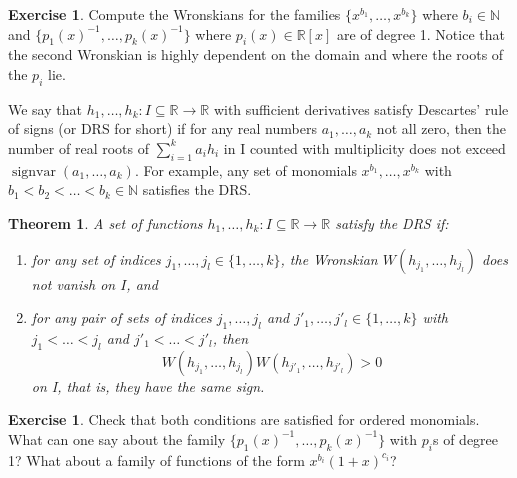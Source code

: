 \documentclass[11pt, a4paper]{article}
\newcommand{\NN}{\mathbb{N}}
\newcommand{\RR}{\mathbb{R}}
\DeclareMathOperator{\sv}{signvar}
\theoremstyle{plain}
\newtheorem{thm}[prop]{Theorem}
\theoremstyle{definition}
\newtheorem{ex}[prop]{Exercise}
\begin{document}
\begin{ex} Compute the Wronskians for the families $\{x^{b_1},\dots,x^{b_k}\}$ where $b_i\in \NN$ and $\{p_1(x)^{-1},\dots,p_k(x)^{-1}\}$ where $p_i(x)\in \RR[x]$ are of degree 1. Notice that the second Wronskian is highly dependent on the domain and where the roots of the $p_i$ lie.
\end{ex}

We say that $h_1,\dots,h_k:I\subseteq\RR\to\RR$ with sufficient derivatives satisfy Descartes' rule of signs (or DRS for short) if for any real numbers $a_1,\dots, a_k$ not all zero, then the number of real roots of $\sum_{i=1}^k a_ih_i$ in I counted with multiplicity does not exceed $\sv(a_1,\dots,a_k)$. For example, any set of monomials $x^{b_1},\dots, x^{b_k}$ with $b_1<b_2<\dots<b_k\in\NN$ satisfies the DRS.

\begin{thm} A set of functions $h_1,\dots,h_k:I\subseteq\RR\to\RR$ satisfy the DRS if:
\begin{enumerate}
\item for any set of indices $j_1,\dots, j_l\in\{1,\dots,k\}$, the Wronskian $W(h_{j_1},\dots,h_{j_l})$ does not vanish on $I$, and
\item for any pair of sets of indices $j_1,\dots, j_l$ and $j'_1,\dots, j'_l\in\{1,\dots,k\}$ with $j_1<\dots<j_l$ and $j'_1<\dots<j'_l$, then
\[W(h_{j_1},\dots,h_{j_l})W(h_{j'_1},\dots,h_{j'_l})>0\]
on I, that is, they have the same sign.
\end{enumerate}
\end{thm}

\begin{ex} Check that both conditions are satisfied for ordered monomials. What can one say about the family $\{p_1(x)^{-1},\dots,p_k(x)^{-1}\}$ with $p_i$s of degree 1? What about a family of functions of the form $x^{b_i}(1+x)^{c_i}$?
\end{ex}
\end{document}
